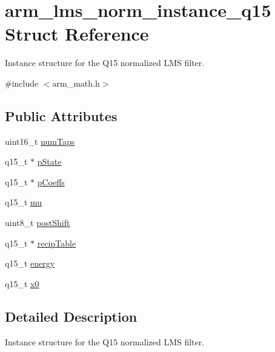 \hypertarget{structarm__lms__norm__instance__q15}{\section{arm\-\_\-lms\-\_\-norm\-\_\-instance\-\_\-q15 Struct Reference}
\label{structarm__lms__norm__instance__q15}
}


Instance structure for the Q15 normalized L\-M\-S filter.  




{\ttfamily \#include $<$arm\-\_\-math.\-h$>$}

\subsection*{Public Attributes}
\begin{DoxyCompactItemize}
\item 
uint16\-\_\-t \hyperlink{structarm__lms__norm__instance__q15_a9ee7a45f4f315d7996a969e25fdc7146}{num\-Taps}
\item 
q15\-\_\-t $\ast$ \hyperlink{structarm__lms__norm__instance__q15_aa4de490b3bdbd03561b76ee07901c8e3}{p\-State}
\item 
q15\-\_\-t $\ast$ \hyperlink{structarm__lms__norm__instance__q15_ae7bca648c75a2ffa02d87852bb78bc8a}{p\-Coeffs}
\item 
q15\-\_\-t \hyperlink{structarm__lms__norm__instance__q15_a7ce00f21d11cfda6d963240641deea8c}{mu}
\item 
uint8\-\_\-t \hyperlink{structarm__lms__norm__instance__q15_aa0d435fbcf7dedb7179d4467e9b79e9f}{post\-Shift}
\item 
q15\-\_\-t $\ast$ \hyperlink{structarm__lms__norm__instance__q15_a9aabb0e4c79f3db807e7a441fa36f5f8}{recip\-Table}
\item 
q15\-\_\-t \hyperlink{structarm__lms__norm__instance__q15_a1c81ded399919d8181026bc1c8602e7b}{energy}
\item 
q15\-\_\-t \hyperlink{structarm__lms__norm__instance__q15_a3fc1d6f97d2c6d5324871de6895cb7e9}{x0}
\end{DoxyCompactItemize}


\subsection{Detailed Description}
Instance structure for the Q15 normalized L\-M\-S filter. 


